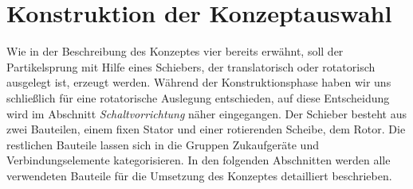 \section{Konstruktion der Konzeptauswahl}
Wie in der Beschreibung des Konzeptes vier bereits erwähnt, soll der Partikelsprung mit Hilfe eines Schiebers, der translatorisch oder rotatorisch ausgelegt ist, erzeugt werden. Während der Konstruktionsphase haben wir uns schließlich für eine rotatorische Auslegung entschieden, auf diese Entscheidung wird im Abschnitt \textit{Schaltvorrichtung} näher eingegangen. Der Schieber besteht aus zwei Bauteilen, einem fixen Stator und einer rotierenden Scheibe, dem Rotor. Die restlichen Bauteile lassen sich in die Gruppen Zukaufgeräte und Verbindungselemente kategorisieren. In den folgenden Abschnitten werden alle verwendeten Bauteile für die Umsetzung des Konzeptes detailliert beschrieben.

